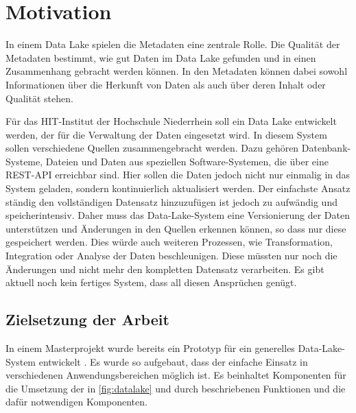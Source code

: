 \pagebreak

\section{Motivation}
\label{sec:einleitung-motivation}

In einem Data Lake spielen die Metadaten eine zentrale Rolle.
Die Qualität der Metadaten bestimmt, wie gut Daten im Data Lake gefunden und in einen Zusammenhang gebracht werden können.
In den Metadaten können dabei sowohl Informationen über die Herkunft von Daten als auch über deren Inhalt oder Qualität stehen.

Für das HIT-Institut der Hochschule Niederrhein soll ein Data Lake entwickelt werden, der für die Verwaltung der Daten eingesetzt wird.
In diesem System sollen verschiedene Quellen zusammengebracht werden.
Dazu gehören Datenbank-Systeme, Dateien und Daten aus speziellen Software-Systemen, die über eine REST-API erreichbar sind.
Hier sollen die Daten jedoch nicht nur einmalig in das System geladen, sondern kontinuierlich aktualisiert werden.
Der einfachste Ansatz ständig den vollständigen Datensatz hinzuzufügen ist jedoch zu aufwändig und speicherintensiv.
Daher muss das Data-Lake-System eine Versionierung der Daten unterstützen und Änderungen in den Quellen erkennen können, so dass nur diese gespeichert werden.
Dies würde auch weiteren Prozessen, wie Transformation, Integration oder Analyse der Daten beschleunigen.
Diese müssten nur noch die Änderungen und nicht mehr den kompletten Datensatz verarbeiten.
Es gibt aktuell noch kein fertiges System, dass all diesen Ansprüchen genügt.

\subsection{Zielsetzung der Arbeit}
\label{sec:ziel}
In einem Masterprojekt wurde bereits ein Prototyp für ein generelles Data-Lake-System entwickelt \parencite{prototyp}.
Es wurde so aufgebaut, dass der einfache Einsatz in verschiedenen Anwendungsbereichen möglich ist.
Es beinhaltet Komponenten für die Umsetzung der in \cref{fig:datalake} und durch \citeauthor{datalake_03} beschriebenen Funktionen und die dafür notwendigen Komponenten.

